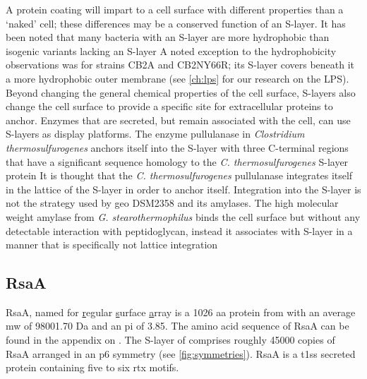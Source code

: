A protein coating will impart to a cell surface with different properties than a `naked' cell; these differences may be a conserved function of an \ac{S-layer}. It has been noted
that many bacteria with an \ac{S-layer} are more hydrophobic than isogenic variants lacking an \ac{S-layer} A noted exception to the hydrophobicity
observations was for \caulobacter strains CB2A and CB2NY66R; its \ac{S-layer} covers beneath it a more hydrophobic outer membrane (see \cref{ch:lps}
for our research on the \caulobacter \ac{LPS}). Beyond changing the general chemical properties of the cell surface, \acp{S-layer} also change the cell surface to provide a
specific site for extracellular proteins to anchor. Enzymes that are secreted, but remain associated with the cell, can use \acp{S-layer} as display platforms. The enzyme
pullulanase in \textit{Clostridium thermosulfurogenes} anchors itself into the \ac{S-layer} with three C-terminal regions that have a significant sequence homology to the
\textit{C. thermosulfurogenes} \ac{S-layer} protein It is thought that the \textit{C. thermosulfurogenes} pullulanase integrates itself in the
lattice of the \ac{S-layer} in order to anchor itself. Integration into the \ac{S-layer} is not the strategy used by \ac{geo} DSM2358 and its amylases. The high molecular weight
amylase from \textit{G. stearothermophilus} binds the cell surface but without any detectable interaction with peptidoglycan, instead it associates with \ac{S-layer} in a manner
that is specifically not lattice integration


\subsection{RsaA} \label{sec:intro-rsaa}

RsaA, named for \underline{r}egular \underline{s}urface \underline{a}rray is a 1026 \ac{aa} protein from \caulobacter with an average \ac{mw}
of 98001.70 Da and an \ac{pi} of 3.85. The amino acid sequence of RsaA can be found in the appendix on . The \ac{S-layer} of \caulobacter comprises roughly
45000 copies of RsaA arranged in an p6 symmetry (see \cref{fig:symmetries}). RsaA is a \ac{t1ss} secreted protein containing five to six \ac{rtx} motifs.

